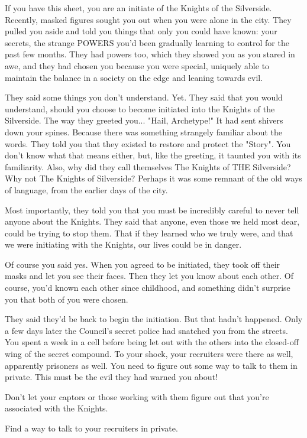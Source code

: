 \documentclass[blue]{Silversiders}
\begin{document}
\name{\bInitiates{}}

If you have this sheet, you are an initiate of the Knights of the Silverside. Recently, masked figures sought you out when you were alone in the city. They pulled you aside and told you things that only you could have known: your secrets, the strange POWERS you'd been gradually learning to control for the past few months. They had powers too, which they showed you as you stared in awe, and they had chosen you because you were special, uniquely able to maintain the balance in a society on the edge and leaning towards evil.

They said some things you don't understand. Yet. They said that you would understand, should you choose to become initiated into the Knights of the Silverside. The way they greeted you... "Hail, Archetype!" It had sent shivers down your spines. Because there was something strangely familiar about the words. They told you that they existed to restore and protect the "Story". You don't know what that means either, but, like the greeting, it taunted you with its familiarity. Also, why did they call themselves The Knights of THE Silverside? Why not The Knights of Silverside? Perhaps it was some remnant of the old ways of language, from the earlier days of the city.

Most importantly, they told you that you must be incredibly careful to never tell anyone about the Knights. They said that anyone, even those we held most dear, could be trying to stop them. That if they learned who we truly were, and that we were initiating with the Knights, our lives could be in danger.

Of course you said yes. When you agreed to be initiated, they took off their masks and let you see their faces. Then they let you know about each other. Of course, you'd known each other since childhood, and something didn't surprise you that both of you were chosen.

They said they'd be back to begin the initiation. But that hadn't happened. Only a few days later the Council's secret police had snatched you from the streets. You spent a week in a cell before being let out with the others into the closed-off wing of the secret compound. To your shock, your recruiters were there as well, apparently prisoners as well. You need to figure out some way to talk to them in private. This must be the evil they had warned you about!

\begin{itemz}[Goals]
  \item Don't let your captors or those working with them figure out that you're associated with the Knights.
  \item Find a way to talk to your recruiters in private.
\end{itemz}
\end{document}
